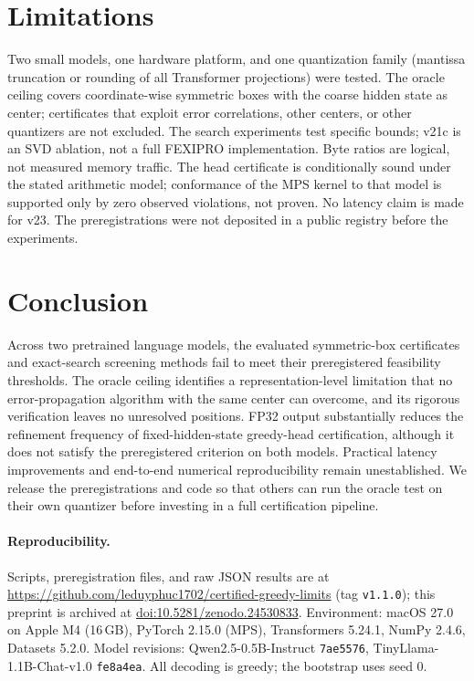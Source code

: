 \documentclass[11pt]{article}
\theoremstyle{definition}
\begin{document}


\section{Limitations}
Two small models, one hardware platform, and one quantization family (mantissa
truncation or rounding of all Transformer projections) were tested. The oracle
ceiling covers coordinate-wise symmetric boxes with the coarse hidden state as
center; certificates that exploit error correlations, other centers, or other
quantizers are not excluded. The search experiments test specific bounds; v21c is
an SVD ablation, not a full FEXIPRO implementation. Byte ratios are logical, not
measured memory traffic. The head certificate is conditionally sound under the
stated arithmetic model; conformance of the MPS kernel to that model is supported
only by zero observed violations, not proven. No latency claim is made for v23. The preregistrations were not deposited in a
public registry before the experiments.

\section{Conclusion}
Across two pretrained language models, the evaluated symmetric-box certificates and
exact-search screening methods fail to meet their preregistered feasibility
thresholds. The oracle ceiling identifies a representation-level limitation that no
error-propagation algorithm with the same center can overcome, and its rigorous
verification leaves no unresolved positions. FP32 output substantially reduces the
refinement frequency of fixed-hidden-state greedy-head certification, although it
does not satisfy the preregistered criterion on both models. Practical latency
improvements and end-to-end numerical reproducibility remain unestablished. We
release the preregistrations and code so that others can run the oracle test on
their own quantizer before investing in a full certification pipeline.

\paragraph{Reproducibility.} Scripts, preregistration files, and raw JSON results
are at \url{https://github.com/leduyphuc1702/certified-greedy-limits} (tag
\texttt{v1.1.0}); this preprint is archived at
\href{https://doi.org/10.5281/zenodo.24530833}{doi:10.5281/zenodo.24530833}. Environment: macOS 27.0 on Apple M4 (16\,GB),
PyTorch 2.15.0 (MPS), Transformers 5.24.1, NumPy 2.4.6, Datasets 5.2.0. Model
revisions: Qwen2.5-0.5B-Instruct \texttt{7ae5576}, TinyLlama-1.1B-Chat-v1.0
\texttt{fe8a4ea}. All decoding is greedy; the bootstrap uses seed 0.
\end{document}
